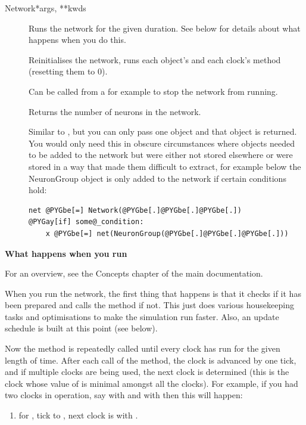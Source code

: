 \documentclass[letterpaper,10pt,english]{manual}
\begin{document}
\begin{classdesc}{Network}{*args, **kwds}
\begin{description}
\item[]
Runs the network for the given duration. See below for details about
what happens when you do this.

\item[]
Reinitialises the network, runs each object's  and each
clock's  method (resetting them to 0).

\item[]
Can be called from a \hyperlink{brian.network_operation}{} for example to stop the
network from running.

\item[]
Returns the number of neurons in the network.

\item[]
Similar to , but you can only pass one object and that
object is returned. You would only need this in obscure
circumstances where objects needed to be added to the network
but were either not stored elsewhere or were stored in a way
that made them difficult to extract, for example below the
NeuronGroup object is only added to the network if certain
conditions hold:

\begin{Verbatim}[commandchars=@\[\]]
net @PYGbe[=] Network(@PYGbe[.]@PYGbe[.]@PYGbe[.])
@PYGay[if] some@_condition:
    x @PYGbe[=] net(NeuronGroup(@PYGbe[.]@PYGbe[.]@PYGbe[.]))
\end{Verbatim}

\end{description}

\textbf{What happens when you run}

For an overview, see the Concepts chapter of the main documentation.

When you run the network, the first thing that happens is that it
checks if it has been prepared and calls the  method
if not. This just does various housekeeping tasks and optimisations
to make the simulation run faster. Also, an update schedule is
built at this point (see below).

Now the  method is repeatedly called until every clock
has run for the given length of time. After each call of the
 method, the clock is advanced by one tick, and if
multiple clocks are being used, the next clock is determined (this
is the clock whose value of  is minimal amongst all the clocks).
For example, if you had two clocks in operation, say  with
 and  with  then this will happen:
\begin{enumerate}
\item {} 
 for , tick  to , next
clock is  with .


\end{enumerate}
\end{classdesc}
\end{document}
